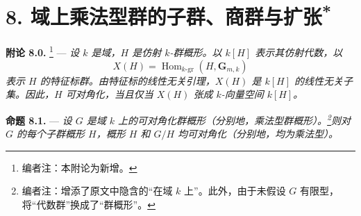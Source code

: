 
\setcounter{footnote}{48}
\section*{8. 域上乘法型群的子群、商群与扩张\textsuperscript{*}}
\begingroup
\renewcommand{\thefootnote}{*}
\begin{NoHyper}
\end{NoHyper}
\endgroup

\medskip
\noindent{}\textbf{附论 8.0.}
\footnote{编者注：本附论为新增。} ---
\textit{设 \(k\) 是域，\(H\) 是仿射 \(k\)-群概形。以 \(k[H]\) 表示其仿射代数，以
\[
  X(H)=\operatorname{Hom}_{k\text{-}\mathrm{gr}}
    (H,\mathbf G_{m,k})
\]
表示 \(H\) 的特征标群。由特征标的线性无关引理，\(X(H)\) 是 \(k[H]\) 的线性无关子集。因此，\(H\) 可对角化，当且仅当 \(X(H)\) 张成 \(k\)-向量空间 \(k[H]\)。}

\medskip
\noindent{}\textbf{命题 8.1.} ---
\textit{设 \(G\) 是域 \(k\) 上的可对角化群概形（分别地，乘法型群概形）。\footnote{编者注：增添了原文中隐含的“在域 \(k\) 上”。此外，由于未假设 \(G\) 有限型，将“代数群”换成了“群概形”。}则对 \(G\) 的每个子群概形 \(H\)，概形 \(H\) 和 \(G/H\) 均可对角化（分别地，均为乘法型）。}

